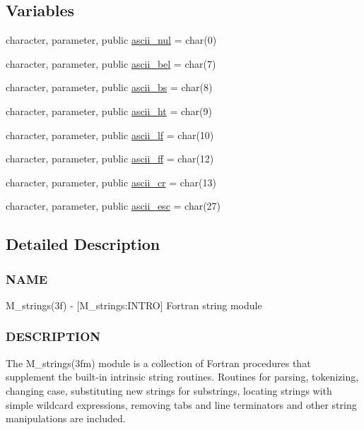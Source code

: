 \subsection*{Variables}
\begin{DoxyCompactItemize}
\item 
character, parameter, public \mbox{\hyperlink{namespacem__strings_a9de5098e31c6411a43323b1d7f19a886}{ascii\+\_\+nul}} = char(0)
\item 
character, parameter, public \mbox{\hyperlink{namespacem__strings_ae939ea755cfa377c5ed5f09ba8b0e923}{ascii\+\_\+bel}} = char(7)
\item 
character, parameter, public \mbox{\hyperlink{namespacem__strings_a6d4b461b6fba6d81e0cee7b6e579c77b}{ascii\+\_\+bs}} = char(8)
\item 
character, parameter, public \mbox{\hyperlink{namespacem__strings_a3fef6116790e59c99f48ea31a7b00133}{ascii\+\_\+ht}} = char(9)
\item 
character, parameter, public \mbox{\hyperlink{namespacem__strings_a4d65d248433f7c6ea3188c558f795c23}{ascii\+\_\+lf}} = char(10)
\item 
character, parameter, public \mbox{\hyperlink{namespacem__strings_a52761941cc3dba4a2ed922d1b7841c90}{ascii\+\_\+ff}} = char(12)
\item 
character, parameter, public \mbox{\hyperlink{namespacem__strings_a1f58b48efb41665079ced6de505a3b65}{ascii\+\_\+cr}} = char(13)
\item 
character, parameter, public \mbox{\hyperlink{namespacem__strings_a6e9a1f921d2bb4a14a9b50a3b8f96288}{ascii\+\_\+esc}} = char(27)
\end{DoxyCompactItemize}


\subsection{Detailed Description}
\subsubsection*{N\+A\+ME}

M\+\_\+strings(3f) -\/ \mbox{[}M\+\_\+strings\+:I\+N\+T\+RO\mbox{]} Fortran string module \subsubsection*{D\+E\+S\+C\+R\+I\+P\+T\+I\+ON}

The M\+\_\+strings(3fm) module is a collection of Fortran procedures that supplement the built-\/in intrinsic string routines. Routines for parsing, tokenizing, changing case, substituting new strings for substrings, locating strings with simple wildcard expressions, removing tabs and line terminators and other string manipulations are included.

